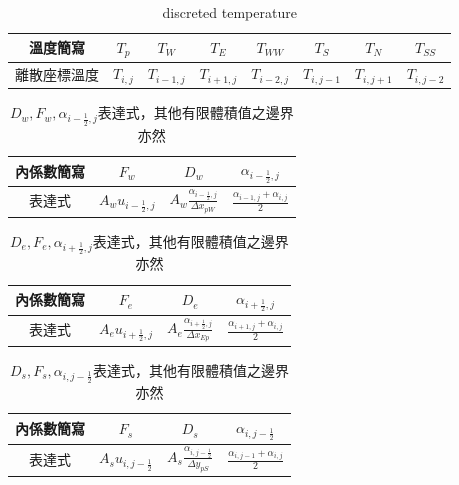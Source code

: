 \documentclass[12pt]{article}
\begin{document}
\begin{table}[H]
    \centering
    \begin{tabular}{|c|c|c|c|c|c|c|c|}
        \hline
        溫度簡寫&$T_{p}$&$T_{W}$& $T_{E}$ & $T_{WW}$&$T_{S}$&$T_{N}$& $T_{SS}$ \\
        \hline
        離散座標溫度&$T_{i,j}$&$T_{i-1,j}$& $T_{i+1,j}$ & $T_{i-2,j}$&$T_{i,j-1}$&$T_{i,j+1}$& $T_{i,j-2}$ \\
        \hline
    \end{tabular}
    \caption{discreted temperature}
    \label{tab:general_discreted_temperature}
\end{table}
\begin{table}[H]
    \centering
    \begin{tabular}{|c|c|c|c|}
        \hline
        內係數簡寫&$F_{w}$&$D_{w}$& $\alpha_{i-\frac{1}{2},j}$ \\ 
        \hline
        表達式&$A_{w}u_{i-\frac{1}{2},j}$&$A_{w}\frac{\alpha_{i-\frac{1}{2},j}}{\Delta x_{pW}}$& $\frac{\alpha_{i-1,j}+\alpha_{i,j}}{2}$ \\
        \hline
    \end{tabular}
    \caption{$D_{w},F_{w},\alpha_{i-\frac{1}{2},j}$表達式，其他有限體積值之邊界亦然}
    \label{tab:1D_e_F_e_alpha}
\end{table}
\begin{table}[H]
    \centering
    \begin{tabular}{|c|c|c|c|}
        \hline
        內係數簡寫&$F_{e}$&$D_{e}$& $\alpha_{i+\frac{1}{2},j}$ \\ 
        \hline
        表達式&$A_{e}u_{i+\frac{1}{2},j}$&$A_{e}\frac{\alpha_{i+\frac{1}{2},j}}{\Delta x_{Ep}}$& $\frac{\alpha_{i+1,j}+\alpha_{i,j}}{2}$ \\
        \hline
    \end{tabular}
    \caption{$D_{e},F_{e},\alpha_{i+\frac{1}{2},j}$表達式，其他有限體積值之邊界亦然}
    \label{tab:2D_e_F_e_alpha}
\end{table}
\begin{table}[H]
    \centering
    \begin{tabular}{|c|c|c|c|}
        \hline
        內係數簡寫&$F_{s}$&$D_{s}$& $\alpha_{i,j-\frac{1}{2}}$ \\ 
        \hline
        表達式&$A_{s}u_{i,j-\frac{1}{2}}$&$A_{s}\frac{\alpha_{i,j-\frac{1}{2}}}{\Delta y_{pS}}$& $\frac{\alpha_{i,j-1}+\alpha_{i,j}}{2}$ \\
        \hline
    \end{tabular}
    \caption{$D_{s},F_{s},\alpha_{i,j-\frac{1}{2}}$表達式，其他有限體積值之邊界亦然}
    \label{tab:D_e_F_e_alpha}
\end{table}
\end{document}
